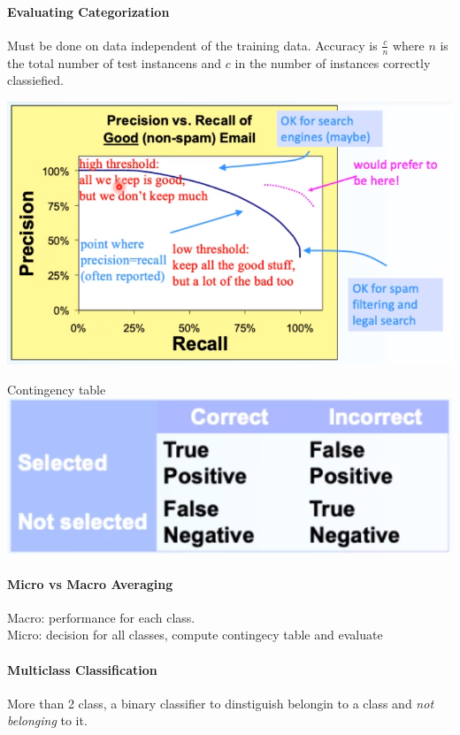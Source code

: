 \documentclass[10pt]{report}
\begin{document}
\paragraph{Evaluating Categorization} Must be done on data independent of the training data. Accuracy is $\frac{c}{n}$ where $n$ is the total number of test instancens and $c$ in the number of instances correctly classiefied.
\begin{center}
	\includegraphics[scale=0.5]{10.png}
\end{center}
\begin{center}
	Contingency table\\
	\includegraphics[scale=0.5]{11.png}
\end{center}
\paragraph{Micro vs Macro Averaging} Macro: performance for each class.\\
Micro: decision for all classes, compute contingecy table and evaluate
\paragraph{Multiclass Classification} More than 2 class, a binary classifier to dinstiguish belongin to a class and \textit{not belonging} to it.
\end{document}
